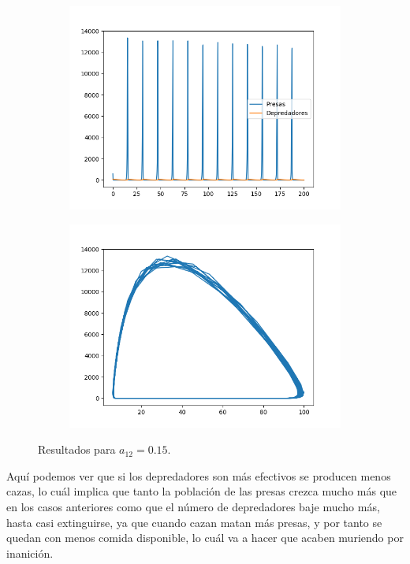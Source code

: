 \documentclass[11pt,a4paper]{article}
\begin{document}
\begin{figure}[H]
\centering
\begin{subfigure}{.5\textwidth}
	\centering
	\includegraphics[scale=0.45]{img/a12}
\end{subfigure}%
\begin{subfigure}{.5\textwidth}
	\centering
	\includegraphics[scale=0.45]{img/circulo-a12}
\end{subfigure}
\caption{Resultados para $a_{12} = 0.15$.}
\end{figure}

Aquí podemos ver que si los depredadores son más efectivos se producen menos cazas,
lo cuál implica que tanto la población de las presas crezca mucho más que en los casos
anteriores como que el número de depredadores baje mucho más, hasta casi extinguirse,
ya que cuando cazan matan más presas, y por tanto se quedan con menos comida disponible,
lo cuál va a hacer que acaben muriendo por inanición.
\end{document}
